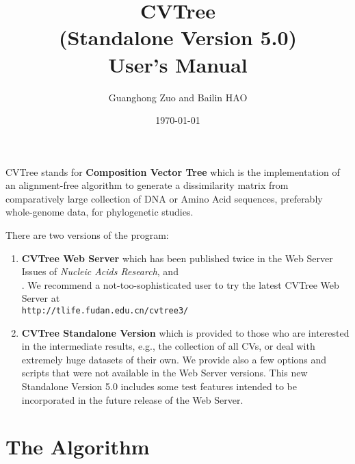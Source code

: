 \documentclass[a4paper,12pt]{article}
\begin{document}
\title{CVTree \\\Large{(Standalone Version 5.0)}\\User's Manual}
\author{Guanghong Zuo and Bailin HAO}
\date{\today}
\maketitle


CVTree stands for {\bf Composition Vector Tree} which is the
implementation of an alignment-free algorithm to generate a
dissimilarity matrix from comparatively large collection of DNA or Amino
Acid sequences, preferably whole-genome data, for phylogenetic studies.

There are two versions of the program:
\begin{enumerate}\itemsep 0pt
\item {\bf CVTree Web Server} which has been published twice in the Web
  Server Issues of {\it Nucleic Acids Research}, \cite{qlh04}
  and\\ \cite{xh09}. We recommend a not-too-sophisticated user to try 
  the latest CVTree Web Server at\\
  {\tt http://tlife.fudan.edu.cn/cvtree3/}
\item {\bf CVTree Standalone Version} which is provided to those who are
  interested in the intermediate results, e.g., the collection of all
  CVs, or deal with extremely huge datasets of their own. We provide
  also a few options and scripts that were not available in the Web
  Server versions. This new Standalone Version 5.0 includes some test
  features intended to be incorporated in the future release of the Web
  Server.
\end{enumerate}

\section{The Algorithm}
\end{document}
